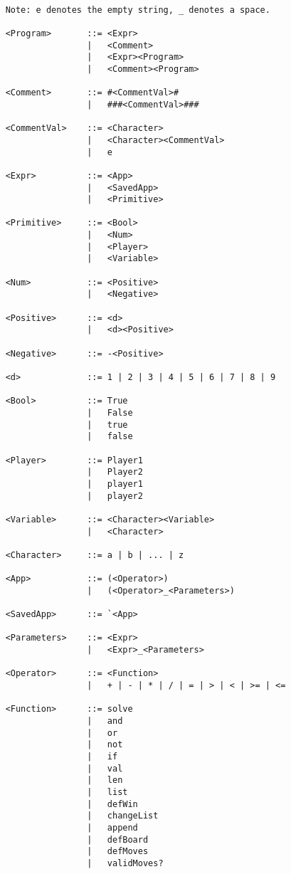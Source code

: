 \documentclass{article}
\begin{document}
\begin{verbatim}

    Note: e denotes the empty string, _ denotes a space.

    <Program>       ::= <Expr>
                    |   <Comment>
                    |   <Expr><Program>
                    |   <Comment><Program>

    <Comment>       ::= #<CommentVal>#
                    |   ###<CommentVal>###

    <CommentVal>    ::= <Character>
                    |   <Character><CommentVal>
                    |   e

    <Expr>          ::= <App>
                    |   <SavedApp>
                    |   <Primitive>

    <Primitive>     ::= <Bool>
                    |   <Num>
                    |   <Player>
                    |   <Variable>

    <Num>           ::= <Positive>
                    |   <Negative>

    <Positive>      ::= <d>
                    |   <d><Positive>

    <Negative>      ::= -<Positive>
    
    <d>             ::= 1 | 2 | 3 | 4 | 5 | 6 | 7 | 8 | 9
    
    <Bool>          ::= True
                    |   False
                    |   true
                    |   false
    
    <Player>        ::= Player1
                    |   Player2
                    |   player1
                    |   player2
                    
    <Variable>      ::= <Character><Variable>
                    |   <Character>
                    
    <Character>     ::= a | b | ... | z

    <App>           ::= (<Operator>)
                    |   (<Operator>_<Parameters>)
                    
    <SavedApp>      ::= `<App>
    
    <Parameters>    ::= <Expr>
                    |   <Expr>_<Parameters>
                    
    <Operator>      ::= <Function>
                    |   + | - | * | / | = | > | < | >= | <=
                    
    <Function>      ::= solve
                    |   and
                    |   or
                    |   not
                    |   if
                    |   val
                    |   len
                    |   list
                    |   defWin
                    |   changeList
                    |   append
                    |   defBoard
                    |   defMoves
                    |   validMoves?
            
\end{verbatim}
\end{document}
